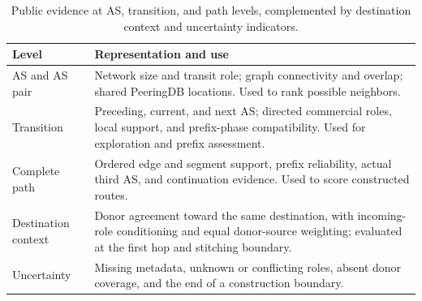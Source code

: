 \begin{table}[t]
\centering
\caption{Public evidence at AS, transition, and path levels, complemented
by destination context and uncertainty indicators.}
\label{tab:method_features}
\small
\begin{tabularx}{\columnwidth}{@{}lX@{}}
\toprule
Level & Representation and use\\
\midrule
AS and AS pair & Network size and transit role; graph connectivity and
overlap; shared PeeringDB locations. Used to rank possible neighbors.\\
Transition & Preceding, current, and next AS; directed commercial roles,
local support, and prefix-phase compatibility. Used for exploration and
prefix assessment.\\
Complete path & Ordered edge and segment support, prefix reliability,
actual third AS, and continuation evidence. Used to score constructed
routes.\\
Destination context & Donor agreement toward the same destination, with
incoming-role conditioning and equal donor-source weighting; evaluated
at the first hop and stitching boundary.\\
Uncertainty & Missing metadata, unknown or conflicting roles, absent
donor coverage, and the end of a construction boundary.\\
\bottomrule
\end{tabularx}
\end{table}
